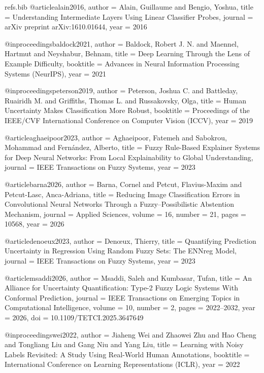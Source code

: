 \begin{filecontents*}[overwrite]{refs.bib}
@article{alain2016,
  author  = {Alain, Guillaume and Bengio, Yoshua},
  title   = {Understanding Intermediate Layers Using Linear Classifier Probes},
  journal = {arXiv preprint arXiv:1610.01644},
  year    = {2016}
}

@inproceedings{baldock2021,
  author    = {Baldock, Robert J. N. and Maennel, Hartmut and Neyshabur, Behnam},
  title     = {Deep Learning Through the Lens of Example Difficulty},
  booktitle = {Advances in Neural Information Processing Systems (NeurIPS)},
  year      = {2021}
}

@inproceedings{peterson2019,
  author    = {Peterson, Joshua C. and Battleday, Ruairidh M. and Griffiths, Thomas L. and Russakovsky, Olga},
  title     = {Human Uncertainty Makes Classification More Robust},
  booktitle = {Proceedings of the IEEE/CVF International Conference on Computer Vision (ICCV)},
  year      = {2019}
}

@article{aghaeipoor2023,
  author  = {Aghaeipoor, Fatemeh and Sabokrou, Mohammad and Fern{\'a}ndez, Alberto},
  title   = {Fuzzy Rule-Based Explainer Systems for Deep Neural Networks: From Local Explainability to Global Understanding},
  journal = {IEEE Transactions on Fuzzy Systems},
  year    = {2023}
}

@article{barna2026,
  author  = {Barna, Cornel and Petcut, Flavius-Maxim and Petcut-Lasc, Anca-Adriana},
  title   = {Reducing Image Classification Errors in Convolutional Neural Networks Through a Fuzzy--Possibilistic Abstention Mechanism},
  journal = {Applied Sciences},
  volume  = {16},
  number  = {21},
  pages   = {10568},
  year    = {2026}
}

@article{denoeux2023,
  author  = {Den{\oe}ux, Thierry},
  title   = {Quantifying Prediction Uncertainty in Regression Using Random Fuzzy Sets: The {ENNreg} Model},
  journal = {IEEE Transactions on Fuzzy Systems},
  year    = {2023}
}

@article{msaddi2026,
  author  = {Msaddi, Saleh and Kumbasar, Tufan},
  title   = {An Alliance for Uncertainty Quantification: Type-2 Fuzzy Logic Systems With Conformal Prediction},
  journal = {IEEE Transactions on Emerging Topics in Computational Intelligence},
  volume  = {10},
  number  = {2},
  pages   = {2022--2032},
  year    = {2026},
  doi     = {10.1109/TETCI.2025.3647649}
}


@inproceedings{wei2022,
  author    = {Jiaheng Wei and Zhaowei Zhu and Hao Cheng and Tongliang Liu and Gang Niu and Yang Liu},
  title     = {Learning with Noisy Labels Revisited: A Study Using Real-World Human Annotations},
  booktitle = {International Conference on Learning Representations (ICLR)},
  year      = {2022}
}


\end{filecontents*}
